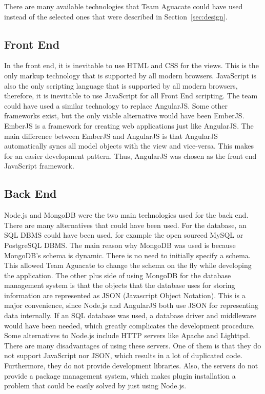 \label{sec:alternatives}
There are many available technologies that Team Aguacate could have used instead of the
selected ones that were described in Section~\ref{sec:design}.

\subsection{Front End}
In the front end, it is inevitable to use HTML and CSS for the views. This is the only
markup technology that is supported by all modern browsers. JavaScript is also the only
scripting language that is supported by all modern browsers, therefore, it is inevitable
to use JavaScript for all Front End scripting. The team could have used a similar technology
to replace AngularJS. Some other frameworks exist, but the only viable alternative would
have been EmberJS. EmberJS is a framework for creating web applications just like AngularJS.
The main difference between EmberJS and AngularJS is that AngularJS automatically syncs all
model objects with the view and vice-versa. This makes for an easier development pattern.
Thus, AngularJS was chosen as the front end JavaScript framework.

\subsection{Back End}
Node.js and MongoDB were the two main technologies used for the back end. There are many
alternatives that could have been used. For the database, an SQL DBMS could have been used,
for example the open sourced MySQL or PostgreSQL DBMS. The main reason why MongoDB was used
is because MongoDB's schema is dynamic. There is no need to initially specify a schema. This
allowed Team Aguacate to change the schema on the fly while developing the application.
The other plus side of using MongoDB for the database management system is that the objects
that the database uses for storing information are represented as JSON (Javascript Object
Notation). This is a major convenience, since Node.js and AngularJS both use JSON for
representing data internally. If an SQL database was used, a database driver and middleware
would have been needed, which greatly complicates the development procedure. Some alternatives to Node.js include HTTP servers like Apache and Lighttpd. There are many
disadvantages of using these servers. One of them is that they do not support JavaScript nor
JSON, which results in a lot of duplicated code. Furthermore, they do not provide
development libraries. Also, the servers do not provide a package management system, which
makes plugin installation a problem that could be easily solved by just using Node.js.
